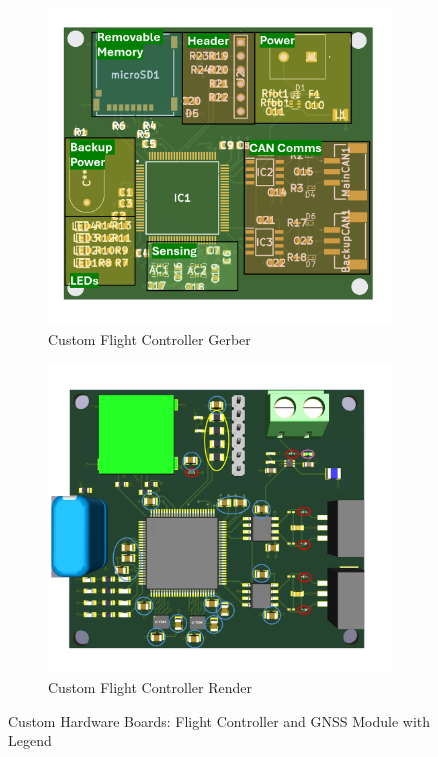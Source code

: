 \begin{figure}[htbp]
  
  \begin{subfigure}[b]{0.48\textwidth}
    \includegraphics[width=\textwidth]{figs/Thomas/Custom Hardware/FC gerber.png}
    \caption{Custom Flight Controller Gerber}
    \label{fig:fc_gerber}
  \end{subfigure}
  \hfill
  \begin{subfigure}[b]{0.48\textwidth}
    \includegraphics[width=\textwidth]{figs/Thomas/Custom Hardware/FC render.png}
    \caption{Custom Flight Controller Render}
    \label{fig:fc_render}
  \end{subfigure}

  \vspace{1em} %

 
  
  \caption{Custom Hardware Boards: Flight Controller and GNSS Module with Legend}
  \label{fig:custom_hardware_overview}
\end{figure}
